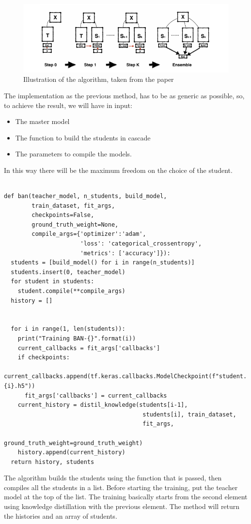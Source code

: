 \begin{figure}[h!]
\centering
\includegraphics[width=1\textwidth]{ban.png}
\caption{Illustration of the algorithm, taken from the paper \cite{ban}}
\end{figure}
The implementation as the previous method, has to be as generic as possible, so, to achieve the result, we will have in input:
\begin{itemize}
\item The master model
\item The function to build the students in cascade
\item The parameters to compile the models.
\end{itemize}
In this way there will be the maximum freedom on the choice of the student.
\newpage
\lstset{language=Python}
\lstset{frame=lines}
\lstset{basicstyle=\footnotesize}
\begin{lstlisting}

def ban(teacher_model, n_students, build_model, 
        train_dataset, fit_args,
        checkpoints=False,
        ground_truth_weight=None,
        compile_args={'optimizer':'adam', 
                      'loss': 'categorical_crossentropy', 
                      'metrics': ['accuracy']}):
  students = [build_model() for i in range(n_students)]
  students.insert(0, teacher_model)
  for student in students:
    student.compile(**compile_args)
  history = []


  for i in range(1, len(students)):
    print("Training BAN-{}".format(i))
    current_callbacks = fit_args['callbacks']
    if checkpoints:
      current_callbacks.append(tf.keras.callbacks.ModelCheckpoint(f"student.{i}.h5"))
      fit_args['callbacks'] = current_callbacks
    current_history = distil_knowledge(students[i-1], 
                                        students[i], train_dataset,
                                        fit_args,
                                        ground_truth_weight=ground_truth_weight)   
    history.append(current_history)
  return history, students

\end{lstlisting}
The algorithm builds the students using the function that is passed, then compiles all the students in a list. Before starting the training, put the teacher model at the top of the list. The training basically starts from the second element using knowledge distillation with the previous element. The method will return the histories and an array of students.
